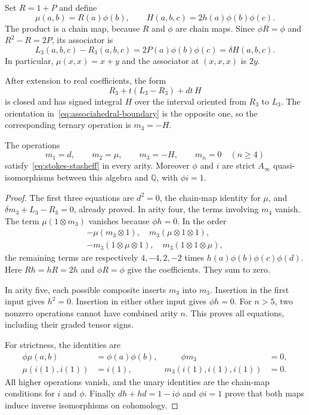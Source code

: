 Set $R=1+P$ and define
\[
 \mu(a,b)=R(a)\phi(b),\qquad
 H(a,b,c)=2h(a)\phi(b)\phi(c).
\]
The product is a chain map, because $R$ and $\phi$ are chain maps.
Since $\phi R=\phi$ and $R^2-R=2P$, its associator is
\[
 L_3(a,b,c)-R_3(a,b,c)=2P(a)\phi(b)\phi(c)=\delta H(a,b,c).
\]
In particular, $\mu(x,x)=x+y$ and the associator at $(x,x,x)$ is $2y$.

After extension to real coefficients, the form
\[
 R_3+t(L_3-R_3)+dt\,H
\]
is closed and has signed integral $H$ over the interval oriented from
$R_3$ to $L_3$.
The orientation in~\eqref{eq:associahedral-boundary} is the opposite one,
so the corresponding ternary operation is $m_3=-H$.

\begin{proposition}\label{prop:explicit-coherent-product}
The operations
\[
 m_1=d,\qquad m_2=\mu,\qquad m_3=-H,\qquad
 m_n=0\quad(n\ge4)
\]
satisfy~\eqref{eq:stokes-stasheff} in every arity.
Moreover $\phi$ and $i$ are strict $A_\infty$ quasi-isomorphisms between
this algebra and $\mathbb Q$, with $\phi i=1$.
\end{proposition}
\begin{proof}
The first three equations are $d^2=0$, the chain-map identity for $\mu$,
and $\delta m_3+L_3-R_3=0$, already proved.
In arity four, the terms involving $m_4$ vanish.
The term $\mu(1\otimes m_3)$ vanishes because $\phi h=0$.
In the order
\[
 \begin{gathered}
 -\mu(m_3\otimes1),\quad
 m_3(\mu\otimes1\otimes1),\\
 -m_3(1\otimes\mu\otimes1),\quad
 m_3(1\otimes1\otimes\mu),
 \end{gathered}
\]
the remaining terms are respectively $4,-4,2,-2$ times
$h(a)\phi(b)\phi(c)\phi(d)$.
Here $Rh=hR=2h$ and $\phi R=\phi$ give the coefficients.
They sum to zero.

In arity five, each possible composite inserts $m_3$ into $m_3$.
Insertion in the first input gives $h^2=0$.
Insertion in either other input gives $\phi h=0$.
For $n>5$, two nonzero operations cannot have combined arity $n$.
This proves all equations, including their graded tensor signs.

For strictness, the identities are
\[
 \begin{aligned}
 \phi\mu(a,b)&=\phi(a)\phi(b),&\qquad \phi m_3&=0,\\
 \mu(i(1),i(1))&=i(1),& m_3(i(1),i(1),i(1))&=0.
 \end{aligned}
\]
All higher operations vanish, and the unary identities are the chain-map
conditions for $i$ and $\phi$.
Finally $dh+hd=1-i\phi$ and $\phi i=1$ prove that both maps
induce inverse isomorphisms on cohomology.
\end{proof}

